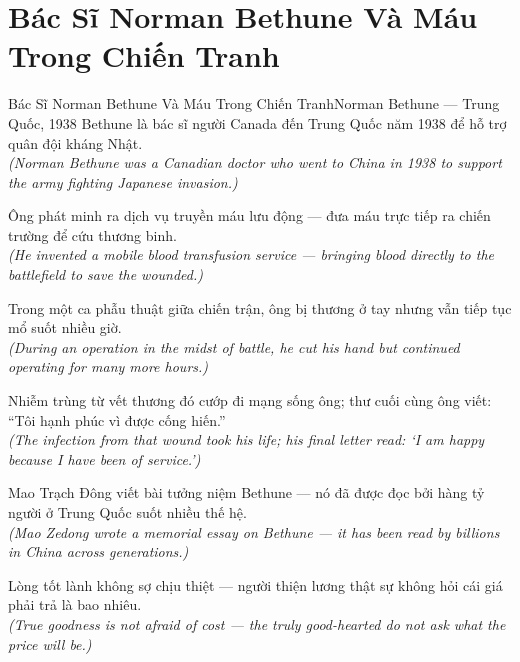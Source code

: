 \section{Bác Sĩ Norman Bethune Và Máu Trong Chiến Tranh}
\begin{truyen}{Bác Sĩ Norman Bethune Và Máu Trong Chiến Tranh}{Norman Bethune --- Trung Quốc, 1938}
 Bethune là bác sĩ người Canada đến Trung Quốc năm 1938 để hỗ trợ quân đội kháng Nhật.\\[4pt]
\textit{(Norman Bethune was a Canadian doctor who went to China in 1938 to support the army fighting Japanese invasion.)}

Ông phát minh ra dịch vụ truyền máu lưu động --- đưa máu trực tiếp ra chiến trường để cứu thương binh.\\[4pt]
\textit{(He invented a mobile blood transfusion service --- bringing blood directly to the battlefield to save the wounded.)}

Trong một ca phẫu thuật giữa chiến trận, ông bị thương ở tay nhưng vẫn tiếp tục mổ suốt nhiều giờ.\\[4pt]
\textit{(During an operation in the midst of battle, he cut his hand but continued operating for many more hours.)}

Nhiễm trùng từ vết thương đó cướp đi mạng sống ông; thư cuối cùng ông viết: ``Tôi hạnh phúc vì được cống hiến.''\\[4pt]
\textit{(The infection from that wound took his life; his final letter read: `I am happy because I have been of service.')}

Mao Trạch Đông viết bài tưởng niệm Bethune --- nó đã được đọc bởi hàng tỷ người ở Trung Quốc suốt nhiều thế hệ.\\[4pt]
\textit{(Mao Zedong wrote a memorial essay on Bethune --- it has been read by billions in China across generations.)}

\end{truyen}
\begin{baihoc}
  Lòng tốt lành không sợ chịu thiệt --- người thiện lương thật sự không hỏi cái giá phải trả là bao nhiêu.\\[4pt]
  \textit{(True goodness is not afraid of cost --- the truly good-hearted do not ask what the price will be.)}
\end{baihoc}

